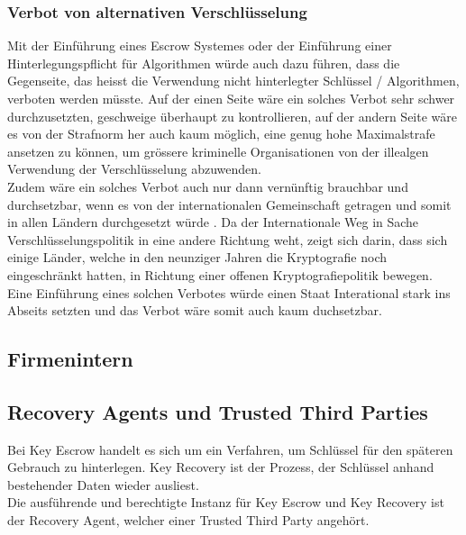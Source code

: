 	
	\subsubsection{Verbot von alternativen Verschlüsselung}
Mit der Einführung eines Escrow Systemes oder der Einführung einer Hinterlegungspflicht für Algorithmen würde auch dazu führen, dass die Gegenseite, das heisst die Verwendung nicht hinterlegter Schlüssel / Algorithmen, verboten werden müsste. Auf der einen Seite wäre ein solches Verbot sehr schwer durchzusetzten, geschweige überhaupt zu kontrollieren, auf der andern Seite wäre es von der Strafnorm her auch kaum möglich, eine genug hohe Maximalstrafe ansetzen zu können, um grössere kriminelle Organisationen von der illealgen Verwendung der Verschlüsselung abzuwenden. \cite{BUND KP 7.3.} \\
Zudem wäre ein solches Verbot auch nur dann vernünftig brauchbar und durchsetzbar, wenn es von der internationalen Gemeinschaft getragen und somit in allen Ländern durchgesetzt würde \cite{GREGG}. Da der Internationale Weg in Sache Verschlüsselungspolitik in eine andere Richtung weht, zeigt sich darin, dass sich einige Länder, welche in den neunziger Jahren die Kryptografie noch eingeschränkt hatten, in Richtung einer offenen Kryptografiepolitik bewegen. \cite{EPIC} \cite{BUND 7.2.3} \\
Eine Einführung eines solchen Verbotes würde einen Staat Interational stark ins Abseits setzten und das Verbot wäre somit auch kaum duchsetzbar.
		
	\subsection{Firmenintern}
	\subsection{Recovery Agents und Trusted Third Parties}
Bei Key Escrow handelt es sich um ein Verfahren, um Schlüssel für den späteren Gebrauch zu hinterlegen. Key Recovery ist der Prozess, der Schlüssel anhand bestehender Daten wieder ausliest.
\\
Die ausführende und berechtigte Instanz für Key Escrow und Key Recovery ist der Recovery Agent, welcher einer Trusted Third Party angehört.

